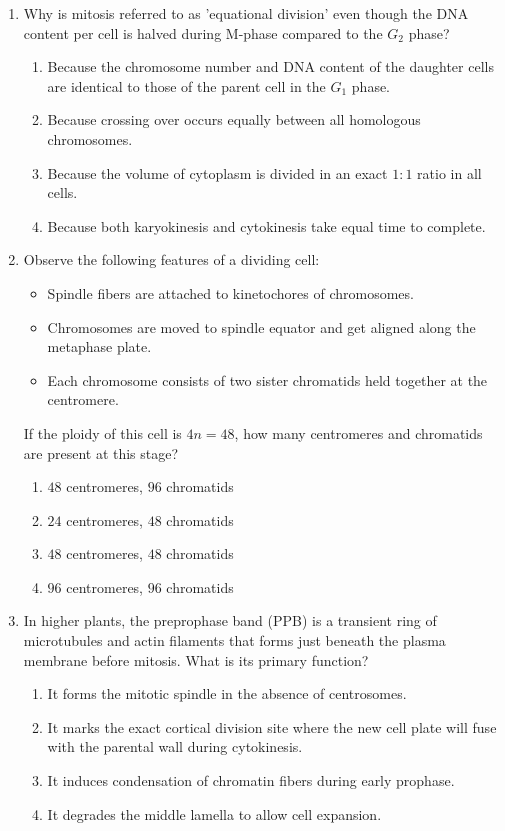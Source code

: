 \documentclass[11pt,a4paper]{article}
\begin{document}
\begin{enumerate}[label=\textbf{\arabic*.}, leftmargin=*]
\item Why is mitosis referred to as 'equational division' even though the DNA content per cell is halved during M-phase compared to the $G_2$ phase?
\begin{enumerate}[label=(\alph*)]
    \item Because the chromosome number and DNA content of the daughter cells are identical to those of the parent cell in the $G_1$ phase.
    \item Because crossing over occurs equally between all homologous chromosomes.
    \item Because the volume of cytoplasm is divided in an exact $1:1$ ratio in all cells.
    \item Because both karyokinesis and cytokinesis take equal time to complete.
\end{enumerate}

\item Observe the following features of a dividing cell:
\begin{itemize}
    \item Spindle fibers are attached to kinetochores of chromosomes.
    \item Chromosomes are moved to spindle equator and get aligned along the metaphase plate.
    \item Each chromosome consists of two sister chromatids held together at the centromere.
\end{itemize}
If the ploidy of this cell is $4n = 48$, how many centromeres and chromatids are present at this stage?
\begin{enumerate}[label=(\alph*)]
    \item $48$ centromeres, $96$ chromatids
    \item $24$ centromeres, $48$ chromatids
    \item $48$ centromeres, $48$ chromatids
    \item $96$ centromeres, $96$ chromatids
\end{enumerate}

\item In higher plants, the preprophase band (PPB) is a transient ring of microtubules and actin filaments that forms just beneath the plasma membrane before mitosis. What is its primary function?
\begin{enumerate}[label=(\alph*)]
    \item It forms the mitotic spindle in the absence of centrosomes.
    \item It marks the exact cortical division site where the new cell plate will fuse with the parental wall during cytokinesis.
    \item It induces condensation of chromatin fibers during early prophase.
    \item It degrades the middle lamella to allow cell expansion.
\end{enumerate}


\end{enumerate}
\end{document}
